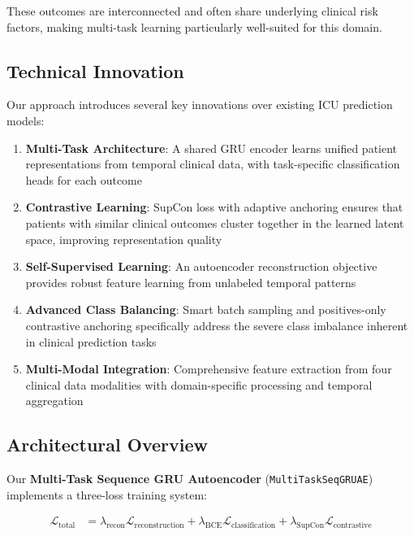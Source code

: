 \documentclass[11pt]{article}
\begin{document}
These outcomes are interconnected and often share underlying clinical risk factors, making multi-task learning particularly well-suited for this domain.

\subsection{Technical Innovation}

Our approach introduces several key innovations over existing ICU prediction models:

\begin{enumerate}
    \item \textbf{Multi-Task Architecture}: A shared GRU encoder learns unified patient representations from temporal clinical data, with task-specific classification heads for each outcome
    
    \item \textbf{Contrastive Learning}: SupCon loss with adaptive anchoring ensures that patients with similar clinical outcomes cluster together in the learned latent space, improving representation quality
    
    \item \textbf{Self-Supervised Learning}: An autoencoder reconstruction objective provides robust feature learning from unlabeled temporal patterns
    
    \item \textbf{Advanced Class Balancing}: Smart batch sampling and positives-only contrastive anchoring specifically address the severe class imbalance inherent in clinical prediction tasks
    
    \item \textbf{Multi-Modal Integration}: Comprehensive feature extraction from four clinical data modalities with domain-specific processing and temporal aggregation
\end{enumerate}

\subsection{Architectural Overview}

Our \textbf{Multi-Task Sequence GRU Autoencoder} (\texttt{MultiTaskSeqGRUAE}) implements a three-loss training system:

\begin{align}
\mathcal{L}_{\text{total}} &= \lambda_{\text{recon}} \mathcal{L}_{\text{reconstruction}} + \lambda_{\text{BCE}} \mathcal{L}_{\text{classification}} + \lambda_{\text{SupCon}} \mathcal{L}_{\text{contrastive}}
\end{align}
\end{document}
